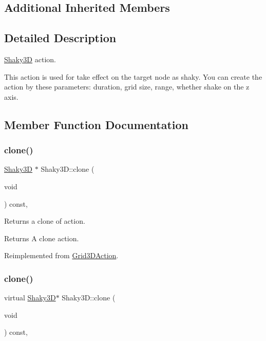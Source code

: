 \subsection*{Additional Inherited Members}


\subsection{Detailed Description}
\hyperlink{classShaky3D}{Shaky3D} action. 

This action is used for take effect on the target node as shaky. You can create the action by these parameters\+: duration, grid size, range, whether shake on the z axis. 

\subsection{Member Function Documentation}
\mbox{\label{classShaky3D_a419f771e52c23750ac4eab5808b76b1b}} 
\subsubsection{\texorpdfstring{clone()}{clone()}\hspace{0.1cm}{\footnotesize\ttfamily [1/2]}}
{\footnotesize\ttfamily \hyperlink{classShaky3D}{Shaky3D} $\ast$ Shaky3\+D\+::clone (\begin{DoxyParamCaption}\item[{void}]{ }\end{DoxyParamCaption}) const\hspace{0.3cm}{\ttfamily [override]}, {\ttfamily [virtual]}}

Returns a clone of action.

\begin{DoxyReturn}{Returns}
A clone action. 
\end{DoxyReturn}


Reimplemented from \hyperlink{classGrid3DAction_a01d5b2d60654ef66d6551ac2190ed14c}{Grid3\+D\+Action}.

\mbox{\label{classShaky3D_adaf0dbadf0e32fab853579c4b8df966b}} 
\subsubsection{\texorpdfstring{clone()}{clone()}\hspace{0.1cm}{\footnotesize\ttfamily [2/2]}}
{\footnotesize\ttfamily virtual \hyperlink{classShaky3D}{Shaky3D}$\ast$ Shaky3\+D\+::clone (\begin{DoxyParamCaption}\item[{void}]{ }\end{DoxyParamCaption}) const\hspace{0.3cm}{\ttfamily [override]}, {\ttfamily [virtual]}}

